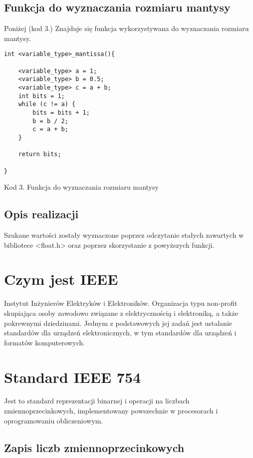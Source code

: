 \documentclass{article}
\begin{document}
\subsection{Funkcja do wyznaczania rozmiaru mantysy}

Poniżej (kod 3.) Znajduje się funkcja wykorzystywana do wyznaczania rozmiaru mantysy.

\begin{verbatim}
int <variable_type>_mantissa(){

    <variable_type> a = 1;
    <variable_type> b = 0.5;
    <variable_type> c = a + b;
    int bits = 1;
    while (c != a) {
        bits = bits + 1;
        b = b / 2;
        c = a + b;
    }

    return bits;

}
\end{verbatim}
\centerline{Kod 3. Funkcja do wyznaczania rozmiaru mantysy}

\subsection{Opis realizacji}
Szukane wartości zostały wyznaczone poprzez odczytanie stałych zawartych w bibliotece <float.h>
oraz poprzez skorzystanie z powyższych funkcji. 

\section{Czym jest IEEE}

Instytut Inżynierów Elektryków i Elektroników. Organizacja typu non-profit skupiająca osoby zawodowo związane z elektrycznością i elektroniką, a także pokrewnymi dziedzinami. Jednym z podstawowych jej zadań jest ustalanie standardów dla urządzeń elektronicznych, w tym standardów dla urządzeń i formatów komputerowych.

\section{Standard IEEE 754}

Jest to standard reprezentacji binarnej i operacji na liczbach zmiennoprzecinkowych, implementowany powszechnie w procesorach i oprogramowaniu obliczeniowym.

\subsection{Zapis liczb zmiennoprzecinkowych}
\end{document}
